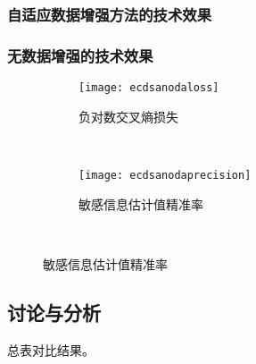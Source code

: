 {	\subsubsection{自适应数据增强方法的技术效果}
	\subsubsection{无数据增强的技术效果}
	\begin{figure}[!h]
		\centering
		\begin{subfigure}[b]{\twof\textwidth}
			\texttt{[image: ecdsanodaloss]}
			\caption{负对数交叉熵损失}
			\label{fig:ecdsanodaloss}
		\end{subfigure}%
		~%
		\begin{subfigure}[b]{\twof\textwidth}
			\texttt{[image: ecdsanodaprecision]}
			\caption{敏感信息估计值精准率}
			\label{fig:ecdsanodaprecision}
		\end{subfigure}
		\\
		\label{fig:ecdsanoda}
	\end{figure}
	\subsection{讨论与分析}
	总表对比结果。
}